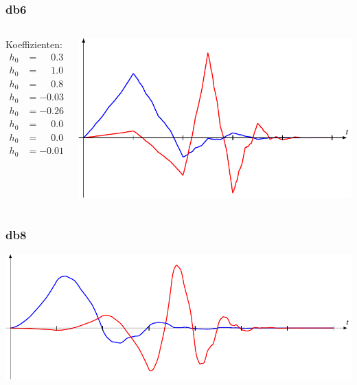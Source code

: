 \begin{frame}
\frametitle{db6}
\begin{columns}[T]
\begin{column}{2.5cm}
Koeffizienten:
\[
\begin{aligned}
h_0&=\phantom{-}0.32580343\\
h_0&=\phantom{-}1.01094572\\
h_0&=\phantom{-}0.8922014\\
h_0&=-0.03967503\\
h_0&=-0.26450717\\
h_0&=\phantom{-}0.0436163\\
h_0&=\phantom{-}0.0465036\\
h_0&=-0.01498699
\end{aligned}
\]
\end{column}
\begin{column}{9.5cm}
\includegraphics{../../buch/chapters/7-algo/images/db3.pdf}
\end{column}
\end{columns}
\end{frame}

\begin{frame}
\frametitle{db8}
\begin{center}
\includegraphics{../../buch/chapters/7-algo/images/db4.pdf}
\end{center}
\end{frame}

